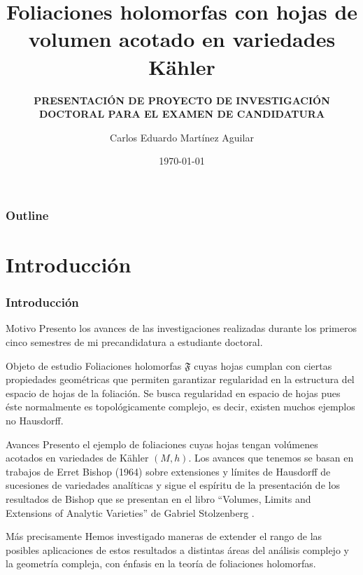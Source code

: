 \documentclass[letterpaper]{beamer}
\title{Foliaciones holomorfas con hojas de volumen acotado en variedades K\"ahler}
\subtitle{\textbf{PRESENTACI\'ON DE PROYECTO DE INVESTIGACI\'ON DOCTORAL PARA EL EXAMEN DE CANDIDATURA}}
\author{Carlos Eduardo Mart\'inez Aguilar}
\institute{UNIVERSIDAD NACIONAL AUTONOMA DE M\'EXICO}
\date{\today}
\begin{document}
\begin{frame}
  \frametitle{}
  \titlepage
\end{frame}

\begin{frame}
\frametitle{Outline}
\tableofcontents
\end{frame}

\section{Introducci\'on}
\begin{frame}
\frametitle{Introducci\'on}
\begin{block}{Motivo}
Presento los avances de las investigaciones realizadas durante los primeros cinco semestres
de mi precandidatura a estudiante doctoral.
\end{block}
\begin{block}{Objeto de estudio} Foliaciones holomorfas $\mathfrak{F}$ cuyas hojas cumplan con ciertas propiedades geom\'etricas que permiten garantizar regularidad en la estructura del espacio de hojas de la foliaci\'on.
Se busca regularidad en espacio de hojas pues \'este normalmente es topol\'ogicamente complejo, es decir, existen muchos ejemplos no Hausdorff.
\end{block}
\end{frame}

\begin{frame}
\begin{block}{Avances}
  Presento el ejemplo de foliaciones cuyas hojas tengan vol\'umenes acotados en variedades de K\"ahler $(M,h)$.
  Los avances que tenemos se basan en trabajos de Erret Bishop \cite{Bishop} (1964) sobre extensiones y l\'imites de Hausdorff
  de sucesiones de variedades anal\'iticas y sigue el esp\'iritu de la presentaci\'on de los resultados de Bishop que se presentan en el
  libro ``Volumes, Limits and Extensions of Analytic Varieties'' de Gabriel Stolzenberg \cite{Stolzenberg}.
\end{block}
\begin{block}{M\'as precisamente}
Hemos investigado maneras de extender el rango de las posibles aplicaciones de estos resultados a
distintas \'areas del an\'alisis complejo y la geometr\'ia compleja, con \'enfasis en la teor\'ia de foliaciones holomorfas.
\end{block}
\end{frame}
\end{document}
